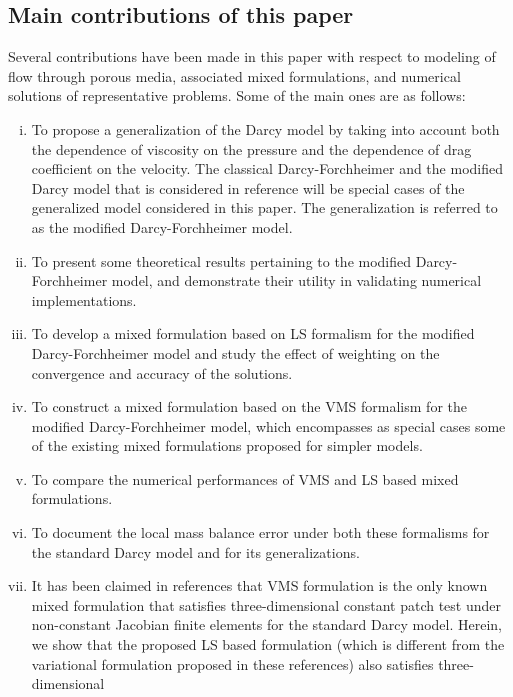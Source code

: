 \documentclass[11pt,reqno]{amsart}
\begin{document}
\subsection{Main contributions of this paper}
Several contributions have been made in this paper 
with respect to modeling of flow through porous 
media, associated mixed formulations, and numerical 
solutions of representative problems. Some of the 
main ones are as follows: 
\begin{enumerate}[(i)]
\item To propose a generalization of the Darcy model 
  by taking into account both the dependence of viscosity 
  on the pressure and the dependence of drag coefficient 
  on the velocity. The classical Darcy-Forchheimer and 
  the modified Darcy model that is considered in reference 
  \cite{Nakshatrala_Rajagopal_IJNMF_2011_v67_p342} will 
  be special cases of the generalized model considered 
  in this paper. The generalization is referred to as 
  the modified Darcy-Forchheimer model. 
\item To present some theoretical results pertaining to 
  the modified Darcy-Forchheimer model, and demonstrate 
  their utility in validating numerical implementations.
\item To develop a mixed formulation based on 
  LS formalism for the modified 
  Darcy-Forchheimer model and study the 
  effect of weighting on the convergence 
  and accuracy of the solutions. 
\item To construct a mixed formulation based on 
  the VMS formalism for the modified Darcy-Forchheimer 
  model, which encompasses as special cases some of the 
  existing mixed formulations proposed for simpler models. 
\item To compare the numerical performances of 
  VMS and LS based mixed formulations. 
\item To document the local mass balance error 
  under both these formalisms for the standard 
  Darcy model and for its generalizations.
\item It has been claimed in references 
  \cite{Nakshatrala_Turner_Hjelmstad_Masud_CMAME_2006_v195_p4036,
  Hughes_Masud_Wan_CMAME_2006_v195_p3347} 
  that VMS formulation is the only known mixed 
  formulation that satisfies three-dimensional 
  constant patch test under non-constant Jacobian 
  finite elements for the standard Darcy model. 
  Herein, we show that the proposed LS based 
  formulation (which is different from the 
  variational formulation proposed in these 
  references) also satisfies three-dimensional 

\end{enumerate}
\end{document}
